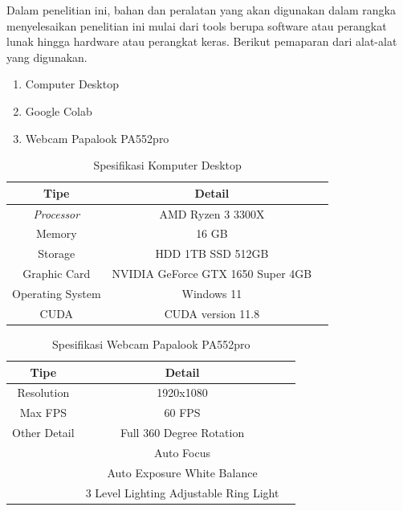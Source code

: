 Dalam penelitian ini, bahan dan peralatan yang akan digunakan dalam rangka menyelesaikan penelitian ini mulai dari tools berupa software atau perangkat lunak hingga hardware atau perangkat keras. Berikut pemaparan dari alat-alat yang digunakan.

\begin{enumerate}[nolistsep]
  \item Computer Desktop
  \item Google Colab
  \item Webcam Papalook PA552pro
\end{enumerate}

\begin{longtable}{|c|c|c|}
  \caption{Spesifikasi Komputer Desktop}
  \label{tb:spesifikasikomputer}                         \\
  \hline
  \textbf{Tipe}      & \textbf{Detail}                   \\
  \hline
  \textit{Processor} & AMD Ryzen 3 3300X                 \\
  Memory             & 16 GB                             \\
  Storage            & HDD 1TB SSD 512GB                 \\
  Graphic Card       & NVIDIA GeForce GTX 1650 Super 4GB \\
  Operating System   & Windows 11                        \\
  CUDA               & CUDA version 11.8                 \\
  \hline
\end{longtable}

\begin{longtable}{|c|c|c|}
  \caption{Spesifikasi Webcam Papalook PA552pro}
  \label{tb:spesifikasiwebcam}                           \\
  \hline
  \textbf{Tipe} & \textbf{Detail}                        \\
  \hline
  Resolution    & 1920x1080                              \\
  Max FPS       & 60 FPS                                 \\
  Other Detail  & Full 360 Degree Rotation               \\
                & Auto Focus                             \\
                & Auto Exposure White Balance            \\
                & 3 Level Lighting Adjustable Ring Light \\
  \hline
\end{longtable}

